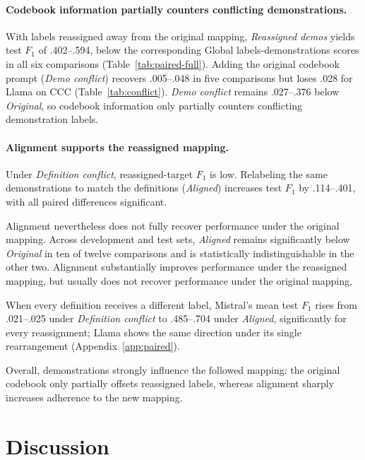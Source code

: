 \documentclass[11pt]{article}
\begin{document}
\paragraph{Codebook information partially counters conflicting demonstrations.}

With labels reassigned away from the original mapping, \emph{Reassigned demos} yields test \(F_1\) of .402--.594, below the corresponding Global labels-demonstrations scores in all six comparisons (Table~\ref{tab:paired-full}). Adding the original codebook prompt (\emph{Demo conflict}) recovers .005--.048 in five comparisons but loses .028 for Llama on CCC (Table~\ref{tab:conflict}). \emph{Demo conflict} remains .027--.376 below \emph{Original}, so codebook information only partially counters conflicting demonstration labels.

\paragraph{Alignment supports the reassigned mapping.}
Under \emph{Definition conflict}, reassigned-target \(F_1\) is low. Relabeling the same demonstrations to match the definitions (\emph{Aligned}) increases test \(F_1\) by .114--.401, with all paired differences significant.

Alignment nevertheless does not fully recover performance under the original mapping. Across development and test sets, \emph{Aligned} remains significantly below \emph{Original} in ten of twelve comparisons and is statistically indistinguishable in the other two. Alignment substantially improves performance under the reassigned mapping, but usually does not recover performance under the original mapping.

When every definition receives a different label, Mistral's mean test \(F_1\) rises from .021--.025 under \emph{Definition conflict} to .485--.704 under \emph{Aligned}, significantly for every reassignment; Llama shows the same direction under its single rearrangement (Appendix~\ref{app:paired}).

Overall, demonstrations strongly influence the followed mapping: the original codebook only partially offsets reassigned labels, whereas alignment sharply increases adherence to the new mapping.

\section{Discussion}
\end{document}
